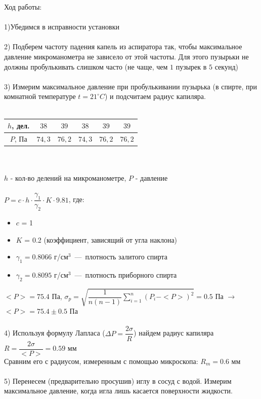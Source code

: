 \documentclass[12pt,a4paper]{article}
\begin{document}
    Ход работы:\\\\
    1)Убедимся в исправности установки\\\\
    2) Подберем частоту падения капель из аспиратора так, чтобы максимальное давление микроманометра не зависело от этой частоты. Для этого пузырьки не должны пробулькивать слишком часто (не чаще, чем $1$ пузырек в $5$ секунд)\\\\
    3) Измерим максимальное давление при пробулькивании пузырька (в спирте, при комнатной температуре $t = 21^{\circ}C$) и подсчитаем радиус капиляра. \\\\
    \begin{tabular}{c | c | c | c | c | c}
        $h$, дел. & $38$ & $39$ & $38$ & $39$ & $39$ \\ \hline
        $P$, Па & $74,3$ & $76,2$ & $74,3$ & $76,2$ & $76,2$ \\ 
    \end{tabular} \\\\
    $h$ - кол-во делений на микроманометре, $P$ - давление \\\\
    $P = c \cdot h \cdot \dfrac{\gamma_1}{\gamma_2} \cdot K \cdot 9.81$, где:\\
    \begin{itemize}
        \item $c$ = 1
        \item $K$ = 0.2 (коэффициент, зависящий от угла наклона)
        \item $\gamma_1 = 0.8066$ г/см$^3$~---~плотность залитого спирта
        \item $\gamma_2 = 0.8095$ г/см$^3$~---~плотность приборного спирта
    \end{itemize}
    $<P> = 75.4$ Па, $\sigma_p = \sqrt{\dfrac{1}{n(n-1)} \sum_{i=1}^n (P_i - <P>)^2} = 0.5$ Па $\rightarrow$ $<P> = 75.4 \pm 0.5$ Па \\\\
    4) Используя формулу Лапласа ($\Delta P = \dfrac{2 \sigma}{R}$) найдем радиус капиляра $R = \dfrac{2 \sigma}{<P>} = 0.59$ мм \\
    Сравним его с радиусом, измеренным с помощью микроскопа: $R_m = 0.6$ мм \\\\
    5) Перенесем (предварительно просушив) иглу в сосуд с водой. Измерим максимальное давление, когда игла лишь касается поверхности жидкости. \\\\
\end{document}
